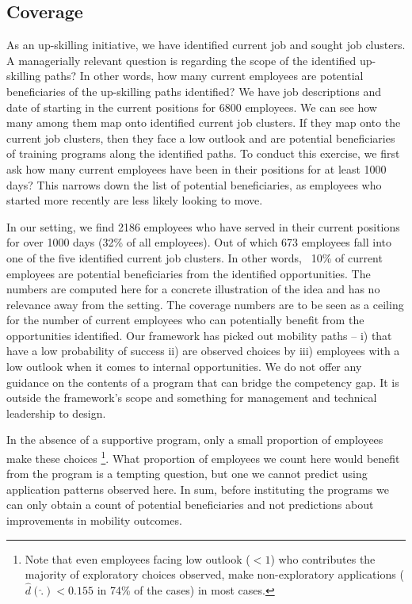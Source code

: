 \documentclass{article}
\begin{document}
\subsection*{Coverage}

As an up-skilling initiative, we have identified current job and sought job clusters. A managerially relevant question is regarding the scope of the identified up-skilling paths? In other words, how many current employees are potential beneficiaries of the up-skilling paths identified? We have job descriptions and date of starting in the current positions for 6800 employees. We can see how many among them map onto identified current job clusters. If they map onto the current job clusters, then they face a low outlook and are potential beneficiaries of training programs along the identified paths. To conduct this exercise, we first ask how many current employees have been in their positions for at least 1000 days? This narrows down the list of potential beneficiaries, as employees who started more recently are less likely looking to move.

In our setting, we find 2186 employees who have served in their current positions for over 1000 days (32\% of all employees). Out of which 673 employees fall into one of the five identified current job clusters. In other words, ~10\% of current employees are potential beneficiaries from the identified opportunities. The numbers are computed here for a concrete illustration of the idea and has no relevance away from the setting. The coverage numbers are to be seen as a ceiling for the number of current employees who can potentially benefit from the opportunities identified. Our framework has picked out mobility paths – i) that have a low probability of success ii) are observed choices by iii) employees with a low outlook when it comes to internal opportunities. We do not offer any guidance on the contents of a program that can bridge the competency gap. It is outside the framework’s scope and something for management and technical leadership to design. 

In the absence of a supportive program, only a small proportion of employees make these choices \footnote{Note that even employees facing low outlook ($ < 1$) who contributes the majority of exploratory choices observed, make non-exploratory applications ($\hat{d}(\hat{.}) < 0.155$ in 74\% of the cases) in most cases.}. What proportion of employees we count here would benefit from the program is a tempting question, but one we cannot predict using application patterns observed here. In sum, before instituting the programs we can only obtain a count of potential beneficiaries and not predictions about improvements in mobility outcomes.
\end{document}
